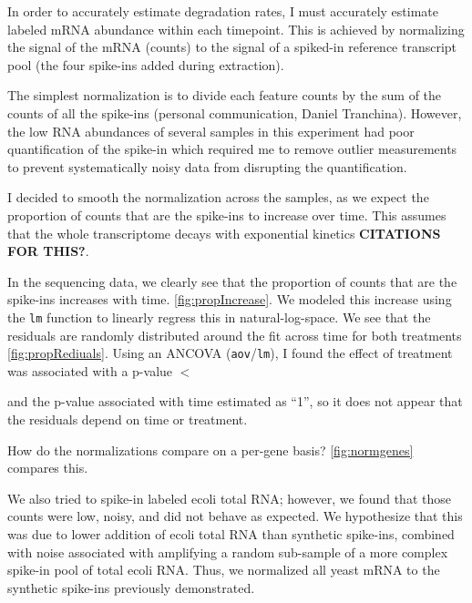 {\label{subsec:4tuNormalization}

In order to accurately estimate degradation rates, I must accurately
estimate labeled mRNA abundance within each timepoint. This is
achieved by normalizing the signal of the mRNA (counts) to the signal
of a spiked-in reference transcript pool (the four spike-ins added
during extraction).

The simplest normalization is to divide each feature counts
by the sum of the counts of all the spike-ins (personal communication,
Daniel Tranchina). However, the low RNA abundances of several 
samples in this experiment had poor quantification of the spike-in 
which required me to remove outlier measurements to prevent 
systematically noisy data from
disrupting the quantification. 

I decided to smooth the normalization across the samples, as we expect
the proportion of counts that are the spike-ins to increase over time.
This assumes that the whole transcriptome decays with exponential
kinetics \textbf{CITATIONS FOR THIS?}.

In the sequencing data, we clearly see that the proportion of counts
that are the spike-ins increases with time.
\autoref{fig:propIncrease}.
We modeled this increase using the \texttt{lm} function to linearly
regress this in natural-log-space. We see that
the residuals are randomly distributed around the fit across time 
for both treatments \autoref{fig:propRediuals}.
Using an ANCOVA (\texttt{aov}/\texttt{lm}), I found the effect of 
treatment was associated with a p-value \(<\)

and the p-value
associated with time estimated as ``1'', so it does not appear that the
residuals depend on time or treatment.


How do the normalizations compare on a per-gene basis? 
\ref{fig:normgenes} compares this.



We also tried to spike-in labeled ecoli total RNA; however, we found
that those counts were low, noisy, and did not behave as expected. We
hypothesize that this was due to lower addition of ecoli total RNA than
synthetic spike-ins, combined with noise associated with amplifying a
random sub-sample of a more complex spike-in pool of total ecoli RNA.
Thus, we normalized all yeast mRNA to the synthetic spike-ins previously
demonstrated.

}
